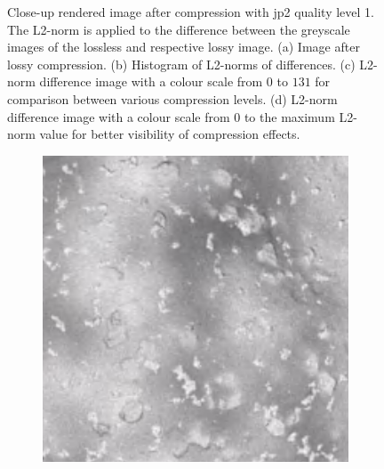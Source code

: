 \begin{figure}[htb]
\begin{subfigure}[b]{0.48\textwidth}
        \caption{}
        \label{fig:img_quality_comp_jp2_1_center_diff_rel}
    \end{subfigure}
    \caption{Close-up rendered image after compression with \gls{jp2} quality level 1. The L2-norm is applied to the difference between the greyscale images of the lossless and respective lossy image. (a) Image after lossy compression. (b) Histogram of L2-norms of differences. (c) L2-norm difference image with a colour scale from $0$ to $131$ for comparison between various compression levels. (d) L2-norm difference image with a colour scale from $0$ to the maximum L2-norm value for better visibility of compression effects.}
    \label{fig:img_quality_comp_jp2_1_center}
\end{figure}

\begin{figure}[htb]
    \centering
    \begin{subfigure}[b]{0.48\textwidth}
        \centering
        \includegraphics[width=\textwidth]{doc/thesis/0_figures/compare_quality/set1/jp2_5_center.png}
        \caption{}
        \label{fig:img_quality_comp_jp2_5_center_orig}
    \end{subfigure}
    \begin{subfigure}[b]{0.48\textwidth}
        \centering

\end{subfigure}
\end{figure}
